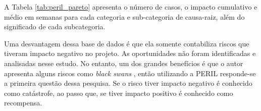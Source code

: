 
A Tabela \ref{tab:peril_pareto} apresenta o número de casos, o impacto cumulativo e médio em semanas para cada categoria e sub-categoria de causa-raiz, além do significado de cada subcategoria.

Uma desvantagem dessa base de dados é que ela somente contabiliza riscos que tiveram impacto negativo no projeto. As oportunidades não foram identificadas e analisadas nesse estudo. No entanto, um dos grandes benefícios é que o autor apresenta alguns riscos como \textit{black swans} \cite{KEND2003BOOK}, então utilizando a PERIL responde-se a primeira questão dessa pesquisa. Se o risco tiver impacto negativo é conhecido como catástrofe, ao passo que, se tiver impacto positivo é conhecido como recompensa.

